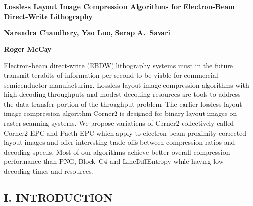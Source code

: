 \documentclass{article}
\begin{document}
\begin{center}

{\LARGE\bf Lossless Layout Image Compression Algorithms
for Electron-Beam Direct-Write Lithography}

\end{center}

\begin{center}

{\large\bf Narendra Chaudhary, Yao Luo, Serap A.~Savari}

\end{center}


\vspace*{.1in}

\begin{center}

{\large\bf Roger McCay}

 \end{center}
\vspace*{.1in}
\noindent Electron-beam direct-write (EBDW) lithography systems must 
in the future transmit terabits of information per second to be viable for
commercial semiconductor manufacturing.  Lossless layout image compression 
algorithms with high decoding throughputs and modest decoding resources
are tools to address the data transfer portion of the throughput problem.
The earlier lossless layout image compression algorithm Corner2 is designed
for binary layout images on raster-scanning systems.  We propose variations
of Corner2 collectively called Corner2-EPC and Paeth-EPC
which apply to electron-beam proximity corrected layout images
and offer interesting trade-offs between compression ratios and decoding
speeds.  Most of our algorithms achieve better overall compression
performance than PNG, Block~C4 and LineDiffEntropy while having low decoding 
times and resources.

\newpage

\subsection*{I. INTRODUCTION}
\end{document}
